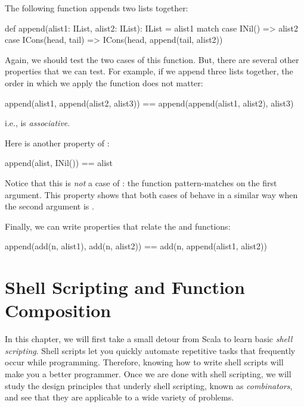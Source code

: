 \documentclass[9pt]{extbook}
\begin{document}
The following function appends two lists together:
%
\begin{scalacode}
def append(alist1: IList, alist2: IList): IList = alist1 match {
  case INil() => alist2
  case ICons(head, tail) => ICons(head, append(tail, alist2))
}
\end{scalacode}

Again, we should test the two cases of this function. But, there are
several other properties that we can test. For example, if we append
three lists together, the order in which we apply the function
does not matter:
%
\begin{scalacode}
append(alist1, append(alist2, alist3)) == append(append(alist1, alist2), alist3)
\end{scalacode}
i.e.,  is \emph{associative}.

Here is another property of :
\begin{scalacode}
append(alist, INil()) == alist
\end{scalacode}
%
Notice that this is \emph{not} a case of : the function
pattern-matches on the first argument. This property shows that both cases
of  behave in a similar way when the second argument is
.

Finally, we can write properties that relate the  and
 functions:
%
\begin{scalacode}
append(add(n, alist1), add(n, alist2)) == add(n, append(alist1, alist2))
\end{scalacode}








\chapter{Shell Scripting and Function Composition}

In this chapter, we will first take a small detour from Scala to learn basic
\emph{shell scripting}. Shell scripts let you quickly automate repetitive tasks
that frequently occur while programming. Therefore, knowing how to write shell
scripts will make you a better programmer. Once we are done with shell
scripting, we will study the design principles that underly shell scripting,
known as \emph{combinators}, and see that they are applicable to a wide variety
of problems.
\end{document}
